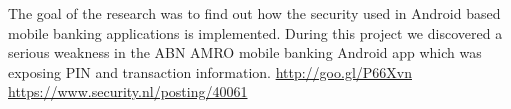 \vspace{2pt}
The goal of the research was to find out how the security used in Android based mobile banking applications is implemented. During this project we discovered a serious weakness in the ABN AMRO mobile banking Android app which was exposing PIN and transaction information. {\faAlternateExternalLink} \url{http://goo.gl/P66Xvn} {\faAlternateExternalLink} \url{https://www.security.nl/posting/40061}
\vspace{12pt}